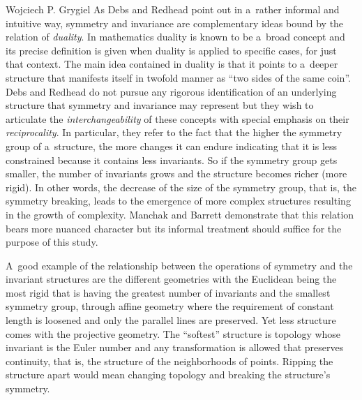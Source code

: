 \begin{artengenv}{Wojciech P. Grygiel}
As Debs and Redhead 
\parencite*[][pp.37–39]{debs_objectivity_2007} %
 point out in a~rather informal and intuitive way, symmetry and invariance are complementary ideas bound by the relation of \textit{duality}. In mathematics duality is known to be a~broad concept and its precise definition is given when duality is applied to specific cases, for just that context. The main idea contained in duality is that it points to a~deeper structure that manifests itself in twofold manner as ``two sides of the same coin''. Debs and Redhead do not pursue any rigorous identification of an underlying structure that symmetry and invariance may represent but they wish to articulate the \textit{interchangeability} of these concepts with special emphasis on their \textit{reciprocality}. In particular, they refer to the fact that the higher the symmetry group of a~structure, the more changes it can endure indicating that it is less constrained because it contains less invariants. So if the symmetry group gets smaller, the number of invariants grows and the structure becomes richer (more rigid). In other words, the decrease of the size of the symmetry group, that is, the symmetry breaking, leads to the emergence of more complex structures resulting in the growth of complexity. Manchak and Barrett 
\parencite*[][]{manchak_hierarchy_2023} %
 demonstrate that this relation bears more nuanced character but its informal treatment should suffice for the purpose of this study.



A~good example of the relationship between the operations of symmetry and the invariant structures are the different geometries with the Euclidean being the most rigid that is having the greatest number of invariants and the smallest symmetry group, through affine geometry where the requirement of constant length is loosened and only the parallel lines are preserved. Yet less structure comes with the projective geometry. The ``softest'' structure is topology whose invariant is the Euler number and any transformation is allowed that preserves continuity, that is, the structure of the neighborhoods of points. Ripping the structure apart would mean changing topology and breaking the structure's symmetry.




\end{artengenv}
